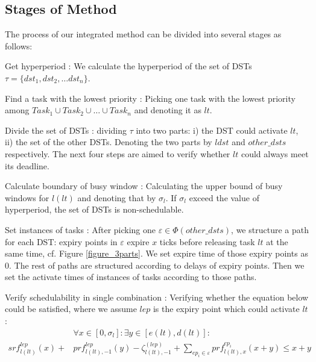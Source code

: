 \documentclass[sigconf]{acmart}
\begin{document}
\subsection{Stages of Method}\label{section_8steps}
The process of our integrated method can be divided into several stages as follows:
\begin{compactdesc}
  \item[Get hyperperiod]: We calculate the hyperperiod of the set of DSTs $\tau=\{dst_1,dst_2, \dots dst_n\}$.

  \item[Find a task with the lowest priority]: Picking one task with the lowest priority among $Task_1\cup Task_2\cup\dots\cup Task_n$ and denoting it as $lt$. 
  \item[Divide the set of DSTs]: dividing $\tau$ into two parts: i) the DST could activate $lt$, ii) the set of the other DSTs. Denoting the two parts by $ldst$ and $other\_dsts$ respectively. The next four steps are aimed to verify whether $lt$ could always meet its deadline. 

  \item[Calculate boundary of busy window]: Calculating the upper bound of busy windows for $l(lt)$ and denoting that by $\sigma_l$. If $\sigma_l$ exceed the value of hyperperiod, the set of DSTs is non-schedulable.
  
  \item[Set instances of tasks]: After picking one $\varepsilon\in\Phi(other\_dsts)$, we structure a path for each DST: expiry points in $\varepsilon$ expire $x$ ticks before releasing task $lt$ at the same time, cf. Figure \ref{figure_3parts}. We set expire time of those expiry points as 0. The rest of paths are structured according to delays of expiry points. Then we set the activate times of instances of tasks according to those paths.

  \item[Verify schedulability in single combination]: Verifying whether the equation below could be satisfied, where we assume $lep$ is the expiry point which could activate $lt$:
  \begin{equation}\begin{split}
      &\forall x\in[0,\sigma_l]:\exists y\in[e(lt),d(lt)]:\\
      srf^{lep}_{l(lt)}(x)+&prf^{lep}_{l(lt),-1}(y)-\zeta^{(lep)}_{l(lt),-1}+\sum\limits_{ep_i\in\varepsilon}prf^{ep_i}_{l(lt),x}(x+y)\leq x+y
    \end{split}\label{equation_verify}\end{equation}
  

\end{compactdesc}
\end{document}
